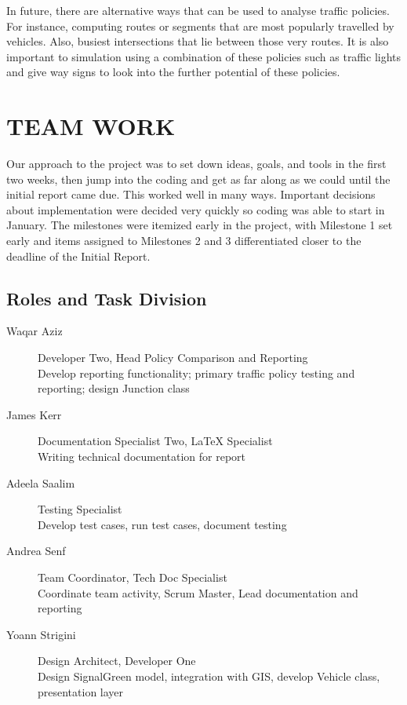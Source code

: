\documentclass[11pt]{article}
\begin{document}
\begin{enumerate}
In future, there are alternative ways that can be used to analyse traffic policies. For instance, computing routes or segments that are most popularly travelled by vehicles. Also, busiest intersections that lie between those very routes. It is also important to simulation using a combination of these policies such as traffic lights and give way signs to look into the further potential of these policies.




\section{TEAM WORK}

Our approach to the project was to set down ideas, goals, and tools in the first two weeks, then jump into the coding and get as far along as we could until the initial report came due. This worked well in many ways. Important decisions about implementation were decided very quickly so coding was able to start in January. The milestones were itemized early in the project, with Milestone 1 set early and items assigned to Milestones 2 and 3 differentiated closer to the deadline of the Initial Report.


\subsection{Roles and Task Division}

\begin{description}
\item [Waqar Aziz] \hspace{16 mm} Developer Two, Head Policy Comparison and Reporting \\
	Develop reporting functionality; primary traffic policy testing and reporting; design Junction class
\item[James Kerr] \hspace{16 mm}  Documentation Specialist Two, LaTeX Specialist \\
	Writing technical documentation for report
\item[Adeela Saalim] \hspace{11 mm} Testing Specialist \\
	Develop test cases, run test cases, document testing
\item[Andrea Senf] \hspace{15 mm} Team Coordinator, Tech Doc Specialist \\
	Coordinate team activity, Scrum Master, Lead documentation and reporting
\item[Yoann Strigini] \hspace{11 mm}  Design Architect, Developer One \\
	Design SignalGreen model, integration with GIS, develop Vehicle class, presentation layer
\end{description}


\end{enumerate}
\end{document}

